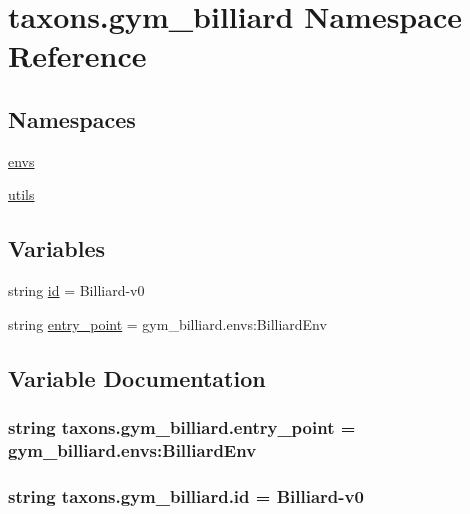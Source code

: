 \hypertarget{namespacetaxons_1_1gym__billiard}{}\section{taxons.\+gym\+\_\+billiard Namespace Reference}
\label{namespacetaxons_1_1gym__billiard}
\subsection*{Namespaces}
\begin{DoxyCompactItemize}
\item 
 \hyperlink{namespacetaxons_1_1gym__billiard_1_1envs}{envs}
\item 
 \hyperlink{namespacetaxons_1_1gym__billiard_1_1utils}{utils}
\end{DoxyCompactItemize}
\subsection*{Variables}
\begin{DoxyCompactItemize}
\item 
string \hyperlink{namespacetaxons_1_1gym__billiard_ad3376469ffca1eac341860a6ba0eeccf}{id} = \textquotesingle{}Billiard-\/v0\textquotesingle{}
\item 
string \hyperlink{namespacetaxons_1_1gym__billiard_a5026fd6842dbf4c737ef64e0ba23c8cc}{entry\+\_\+point} = \textquotesingle{}gym\+\_\+billiard.\+envs\+:\+Billiard\+Env\textquotesingle{}
\end{DoxyCompactItemize}


\subsection{Variable Documentation}
\subsubsection[{\texorpdfstring{entry\+\_\+point}{entry_point}}]{\setlength{\rightskip}{0pt plus 5cm}string taxons.\+gym\+\_\+billiard.\+entry\+\_\+point = \textquotesingle{}gym\+\_\+billiard.\+envs\+:\+Billiard\+Env\textquotesingle{}}\hypertarget{namespacetaxons_1_1gym__billiard_a5026fd6842dbf4c737ef64e0ba23c8cc}{}\label{namespacetaxons_1_1gym__billiard_a5026fd6842dbf4c737ef64e0ba23c8cc}
\subsubsection[{\texorpdfstring{id}{id}}]{\setlength{\rightskip}{0pt plus 5cm}string taxons.\+gym\+\_\+billiard.\+id = \textquotesingle{}Billiard-\/v0\textquotesingle{}}\hypertarget{namespacetaxons_1_1gym__billiard_ad3376469ffca1eac341860a6ba0eeccf}{}\label{namespacetaxons_1_1gym__billiard_ad3376469ffca1eac341860a6ba0eeccf}
